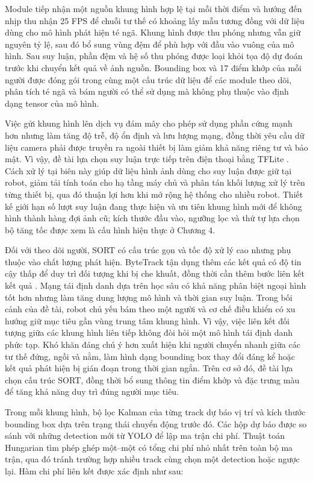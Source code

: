 Module tiếp nhận một nguồn khung hình hợp lệ tại mỗi thời điểm và hướng đến nhịp thu nhận 25 FPS để chuỗi tư thế có khoảng lấy mẫu tương đồng với dữ liệu dùng cho mô hình phát hiện té ngã. Khung hình được thu phóng nhưng vẫn giữ nguyên tỷ lệ, sau đó bổ sung vùng đệm để phù hợp với đầu vào vuông của mô hình. Sau suy luận, phần đệm và hệ số thu phóng được loại khỏi tọa độ dự đoán trước khi chuyển kết quả về ảnh nguồn. Bounding box và 17 điểm khớp của mỗi người được đóng gói trong cùng một cấu trúc dữ liệu để các module theo dõi, phân tích té ngã và bám người có thể sử dụng mà không phụ thuộc vào định dạng tensor của mô hình.

Việc gửi khung hình lên dịch vụ đám mây cho phép sử dụng phần cứng mạnh hơn nhưng làm tăng độ trễ, độ ổn định và lưu lượng mạng, đồng thời yêu cầu dữ liệu camera phải được truyền ra ngoài thiết bị làm giảm khả năng riêng tư và bảo mật. Vì vậy, đề tài lựa chọn suy luận trực tiếp trên điện thoại bằng TFLite . Cách xử lý tại biên này giúp dữ liệu hình ảnh dùng cho suy luận được giữ tại robot, giảm tải tính toán cho hạ tầng máy chủ và phân tán khối lượng xử lý trên từng thiết bị, qua đó thuận lợi hơn khi mở rộng hệ thống cho nhiều robot. Thiết kế giới hạn số lượt suy luận đang thực hiện và ưu tiên khung hình mới để không hình thành hàng đợi ảnh cũ; kích thước đầu vào, ngưỡng lọc và thứ tự lựa chọn bộ tăng tốc được xem là cấu hình hiện thực ở Chương 4.

Đối với theo dõi người, SORT có cấu trúc gọn và tốc độ xử lý cao nhưng phụ thuộc vào chất lượng phát hiện. ByteTrack tận dụng thêm các kết quả có độ tin cậy thấp để duy trì đối tượng khi bị che khuất, đồng thời cần thêm bước liên kết kết quả . Mạng tái định danh dựa trên học sâu có khả năng phân biệt ngoại hình tốt hơn nhưng làm tăng dung lượng mô hình và thời gian suy luận. Trong bối cảnh của đề tài, robot chủ yếu bám theo một người và cơ chế điều khiển có xu hướng giữ mục tiêu gần vùng trung tâm khung hình. Vì vậy, việc liên kết đối tượng giữa các khung hình liên tiếp không đòi hỏi một mô hình tái định danh phức tạp. Khó khăn đáng chú ý hơn xuất hiện khi người chuyển nhanh giữa các tư thế đứng, ngồi và nằm, làm hình dạng bounding box thay đổi đáng kể hoặc kết quả phát hiện bị gián đoạn trong thời gian ngắn. Trên cơ sở đó, đề tài lựa chọn cấu trúc SORT, đồng thời bổ sung thông tin điểm khớp và đặc trưng màu để tăng khả năng duy trì đúng người mục tiêu.

Trong mỗi khung hình, bộ lọc Kalman của từng track dự báo vị trí và kích thước bounding box dựa trên trạng thái chuyển động trước đó. Các hộp dự báo được so sánh với những detection mới từ YOLO để lập ma trận chi phí. Thuật toán Hungarian tìm phép ghép một--một có tổng chi phí nhỏ nhất trên toàn bộ ma trận, qua đó tránh trường hợp nhiều track cùng chọn một detection hoặc ngược lại. Hàm chi phí liên kết được xác định như sau:

